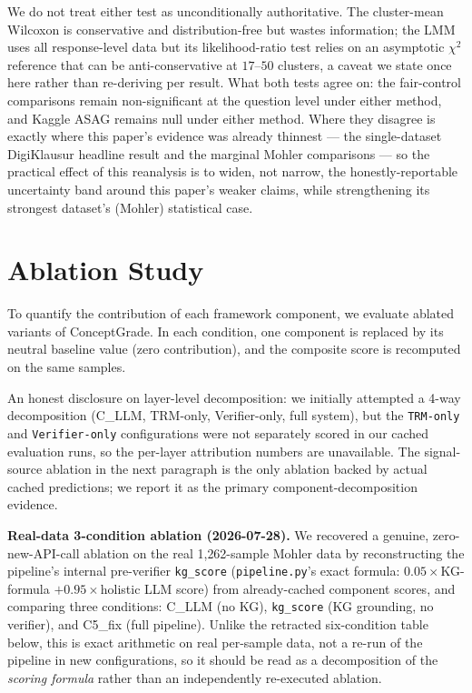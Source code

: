 \documentclass[conference]{IEEEtran}
\begin{document}
We do not treat either test as unconditionally authoritative. The
cluster-mean Wilcoxon is conservative and distribution-free but wastes
information; the LMM uses all response-level data but its likelihood-ratio
test relies on an asymptotic $\chi^2$ reference that can be anti-conservative
at $17$--$50$ clusters, a caveat we state once here rather than re-deriving
per result. What both tests agree on: the fair-control comparisons remain
non-significant at the question level under either method, and Kaggle ASAG
remains null under either method. Where they disagree is exactly where this
paper's evidence was already thinnest --- the single-dataset DigiKlausur
headline result and the marginal Mohler comparisons --- so the practical
effect of this reanalysis is to widen, not narrow, the honestly-reportable
uncertainty band around this paper's weaker claims, while strengthening its
strongest dataset's (Mohler) statistical case.

\section{Ablation Study}
\label{sec:ablation}

To quantify the contribution of each framework component, we evaluate ablated variants of ConceptGrade. In each condition, one component is replaced by its neutral baseline value (zero contribution), and the composite score is recomputed on the same samples.

An honest disclosure on layer-level decomposition: we initially attempted
a 4-way decomposition (C\_LLM, TRM-only, Verifier-only, full system),
but the \texttt{TRM-only} and \texttt{Verifier-only} configurations were
not separately scored in our cached evaluation runs, so the per-layer
attribution numbers are unavailable. The signal-source ablation in the
next paragraph is the only ablation backed by actual cached predictions;
we report it as the primary component-decomposition evidence.

\textbf{Real-data 3-condition ablation (2026-07-28).} We recovered a
genuine, zero-new-API-call ablation on the real 1{,}262-sample Mohler
data by reconstructing the pipeline's internal pre-verifier
\texttt{kg\_score} (\texttt{pipeline.py}'s exact formula: $0.05\times$KG-formula
$+ 0.95\times$holistic LLM score) from already-cached component scores,
and comparing three conditions: C\_LLM (no KG), \texttt{kg\_score} (KG
grounding, no verifier), and C5\_fix (full pipeline). Unlike the
retracted six-condition table below, this is exact arithmetic on real
per-sample data, not a re-run of the pipeline in new configurations, so
it should be read as a decomposition of the \emph{scoring formula}
rather than an independently re-executed ablation.
\end{document}
